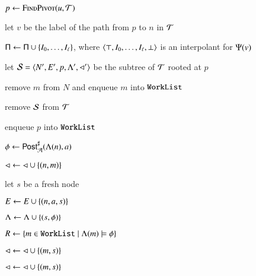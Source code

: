 \documentclass[10pt,conference,letterpaper,twocolumn]{IEEEtran}
\begin{document}
\begin{algorithm}[t!]
{\begin{algorithmic}[1]
  \State $p \leftarrow \Call{FindPivot}{u,\Art}$
  \label{ln:pivot}

  \State let $v$ be the label of the path from $p$ to $n$ in $\mathcal{T}$
  
  \State $\mathsf{\Pi} \leftarrow \mathsf{\Pi} \cup \left\{ I_0,\ldots,I_\ell \right\}$,
  where $\left\langle \top,I_0,\ldots,I_\ell,\bot \right\rangle$ is an interpolant for
  $\Psi(v)$

  \State let $\mathcal{S} = \left\langle N',E',p,\Lambda',\lhd' \right\rangle$ be the subtree
  of $\mathcal{T}$ rooted at $p$


  \State remove $m$ from $N$ and enqueue $m$ into $\mathtt{WorkList}$

  \State remove $\mathcal{S}$ from $\mathcal{T}$

  \State enqueue $p$ into $\mathtt{WorkList}$
  \label{ln:refine}

  \EndFor

  \EndIf

  \Else \label{ln:else}

  \label{ln:forall-events}

  \State $\phi \leftarrow {\mathsf{Post}}^\sharp_{\mathcal{A}}(\Lambda(n),a)$

   \label{ln:covered}

  \State $\lhd \leftarrow \lhd \cup \left\{ (n,m) \right\}$ 
  \label{ln:direct-cover}

  \Else 

  \State let $s$ be a fresh node

  \State $E \leftarrow E \cup \left\{ (n,a,s) \right\}$

  \State $\Lambda \leftarrow \Lambda \cup \left\{ (s,\phi) \right\}$

  \State $R \leftarrow \left\{ m \in \mathtt{WorkList} \mid \Lambda(m) \models
    \phi \right\}$ 

  

  \State $\lhd \leftarrow \lhd \cup \left\{ (m,s) \right\}$ 
  \label{ln:child-cover}

  \EndFor


  \State $\lhd \leftarrow \lhd \cup \left\{ (m,s) \right\}$ 
  \label{ln:indirect-cover}


\end{algorithmic}}
\end{algorithm}
\end{document}
